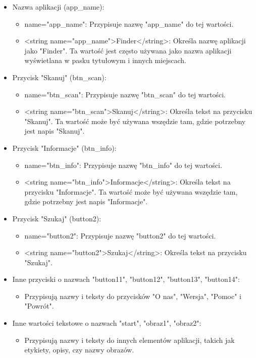 \begin{itemize}
	\item Nazwa aplikacji (app\_name):
	\begin{itemize}
		\item name="app\_name": Przypisuje nazwę "app\_name" do tej wartości.
		\item <string name="app\_name">Finder</string>: Określa nazwę aplikacji jako "Finder". Ta wartość jest często używana jako nazwa aplikacji wyświetlana w pasku tytułowym i innych miejscach.
	\end{itemize}
	\item Przycisk "Skanuj" (btn\_scan):
	\begin{itemize}
		\item name="btn\_scan": Przypisuje nazwę "btn\_scan" do tej wartości.
		\item <string name="btn\_scan">Skanuj</string>: Określa tekst na przycisku "Skanuj". Ta wartość może być używana wszędzie tam, gdzie potrzebny jest napis "Skanuj".
	\end{itemize}
	\item Przycisk "Informacje" (btn\_info):
	\begin{itemize}
		\item name="btn\_info": Przypisuje nazwę "btn\_info" do tej wartości.
		\item <string name="btn\_info">Informacje</string>: Określa tekst na przycisku "Informacje". Ta wartość może być używana wszędzie tam, gdzie potrzebny jest napis "Informacje".
	\end{itemize}
	\item Przycisk "Szukaj" (button2):
	\begin{itemize}
		\item name="button2": Przypisuje nazwę "button2" do tej wartości.
		\item <string name="button2">Szukaj</string>: Określa tekst na przycisku "Szukaj".
	\end{itemize}
	\item Inne przyciski o nazwach "button11", "button12", "button13", "button14":
	\begin{itemize}
		\item Przypisują nazwy i teksty do przycisków "O nas", "Wersja", "Pomoc" i "Powrót".
	\end{itemize}
	\item Inne wartości tekstowe o nazwach "start", "obraz1", "obraz2":
	\begin{itemize}
		\item Przypisują nazwy i teksty do innych elementów aplikacji, takich jak etykiety, opisy, czy nazwy obrazów.
	\end{itemize}
\end{itemize}

